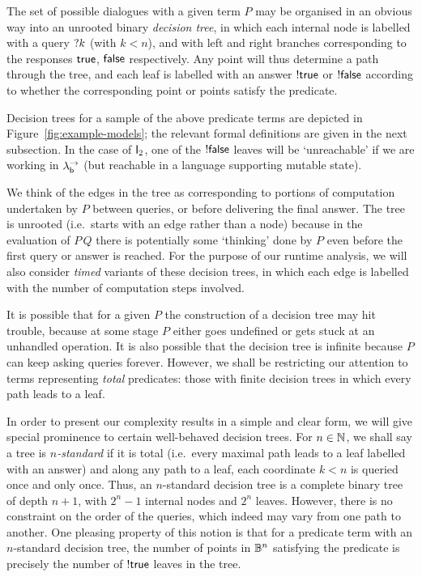 \documentclass[12pt,phd,lfcs,twoside,openright,logo,leftchapter,normalheadings]{infthesis}
\theoremstyle{plain}
\theoremstyle{definition}
\begin{document}
The set of possible dialogues with a given term $P$ may be organised
in an obvious way into an unrooted binary \emph{decision tree}, in
which each internal node is labelled with a query $\mathord{?} k$ (with
$k<n$), and with left and right branches corresponding to the
responses $\mathsf{true}$, $\mathsf{false}$ respectively.  Any point will thus
determine a path through the tree, and each leaf is labelled with an
answer $\mathord{!} \mathsf{true}$ or $\mathord{!} \mathsf{false}$ according to whether the
corresponding point or points satisfy the predicate.

Decision trees for a sample of the above predicate terms are depicted
in Figure~\ref{fig:example-models}; the relevant formal definitions
are given in the next subsection.  In the case of $\mathsf{I}_2$, one of
the $\mathord{!} \mathsf{false}$ leaves will be `unreachable' if we are working in
$\lambda^\rightarrow_{\mathsf{b}}$ (but reachable in a language supporting mutable state).

We think of the edges in the tree as corresponding to portions of
computation undertaken by $P$ between queries, or before delivering
the final answer.  The tree is unrooted (i.e.\ starts with an edge
rather than a node) because in the evaluation of $P\,Q$ there is
potentially some `thinking' done by $P$ even before the first query or
answer is reached.  For the purpose of our runtime analysis, we will
also consider \emph{timed} variants of these decision trees, in which
each edge is labelled with the number of computation steps involved.

It is possible that for a given $P$ the construction of a decision
tree may hit trouble, because at some stage $P$ either goes undefined
or gets stuck at an unhandled operation.  It is also possible that the
decision tree is infinite because $P$ can keep asking queries forever.
However, we shall be restricting our attention to terms representing
\emph{total} predicates: those with finite decision trees in which
every path leads to a leaf.

In order to present our complexity results in a simple and clear form,
we will give special prominence to certain well-behaved decision
trees.  For $n \in \mathbb{N}$, we shall say a tree is \emph{$n$-standard} if
it is total (i.e.\ every maximal path leads to a leaf labelled with an
answer) and along any path to a leaf, each coordinate $k<n$ is queried
once and only once. Thus, an $n$-standard decision tree is a complete
binary tree of depth $n+1$, with $2^n - 1$ internal nodes and $2^n$
leaves.  However, there is no constraint on the order of the queries,
which indeed may vary from one path to another.  One pleasing property
of this notion is that for a predicate term with an $n$-standard
decision tree, the number of points in $\mathbb{B}^n$ satisfying the predicate
is precisely the number of $\mathord{!} \mathsf{true}$ leaves in the tree.
\end{document}
